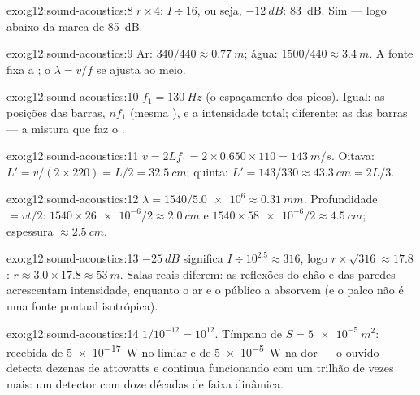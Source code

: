 \begin{solution}{exo:g12:sound-acoustics:8}
$r \times 4$: $I \div 16$, ou seja, $-\qty{12}{dB}$: \qty{83}{dB}. Sim
--- logo abaixo da marca de \qty{85}{dB}.
\end{solution}

\begin{solution}{exo:g12:sound-acoustics:9}
Ar: $340/440 \approx \qty{0.77}{m}$; água:
$1500/440 \approx \qty{3.4}{m}$. A fonte fixa a ; o
 $\lambda = v/f$ se ajusta ao meio.
\end{solution}

\begin{solution}{exo:g12:sound-acoustics:10}
$f_1 = \qty{130}{Hz}$ (o espaçamento dos picos). Igual: as posições das
barras, $nf_1$ (mesma ), e a intensidade total; diferente: as
 das barras --- a mistura que faz o .
\end{solution}

\begin{solution}{exo:g12:sound-acoustics:11}
$v = 2Lf_1 = 2 \times 0.650 \times 110 = \qty{143}{m/s}$. Oitava:
$L' = v/(2 \times 220) = L/2 = \qty{32.5}{cm}$; quinta:
$L' = 143/330 \approx \qty{43.3}{cm} = 2L/3$.
\end{solution}

\begin{solution}{exo:g12:sound-acoustics:12}
$\lambda = 1540/\num{5.0e6} \approx \qty{0.31}{mm}$. Profundidade
$= vt/2$: $1540 \times \num{26e-6}/2 \approx \qty{2.0}{cm}$ e
$1540 \times \num{58e-6}/2 \approx \qty{4.5}{cm}$; espessura
$\approx \qty{2.5}{cm}$.
\end{solution}

\begin{solution}{exo:g12:sound-acoustics:13}
$-\qty{25}{dB}$ significa $I \div 10^{2.5} \approx 316$, logo
$r \times \sqrt{316} \approx 17.8$:
$r \approx 3.0 \times 17.8 \approx \qty{53}{m}$. Salas reais diferem: as
reflexões do chão e das paredes acrescentam intensidade, enquanto o ar e
o público a absorvem (e o palco não é uma fonte pontual isotrópica).
\end{solution}

\begin{solution}{exo:g12:sound-acoustics:14}
$1/10^{-12} = 10^{12}$. Tímpano de $S = \qty{5e-5}{m^2}$: 
recebida de \qty{5e-17}{W} no limiar e de \qty{5e-5}{W} na dor --- o
ouvido detecta dezenas de attowatts e continua funcionando com um
trilhão de vezes mais: um detector com doze décadas de faixa dinâmica.
\end{solution}

